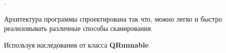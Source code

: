 .

Архитектура программы спроектирована так что, можно легко и быстро
реализовывать различные способы сканирования.

Используя наследования от класса \textbf{QRunnable}

